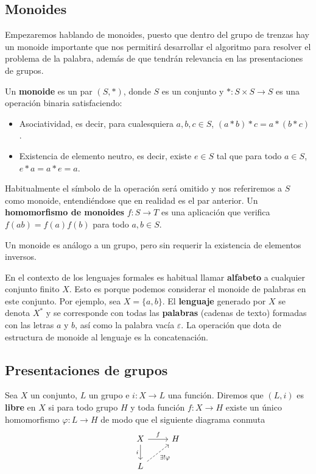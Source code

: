 \documentclass[bibtex, anon]{TEMat-article}
\begin{document}
\subsection{Monoides}

Empezaremos hablando de monoides, puesto que dentro del grupo de trenzas hay un monoide importante que nos permitirá desarrollar el algoritmo para resolver el problema de la palabra, además de que tendrán relevancia en las presentaciones de grupos.



\begin{definicion}
	Un \textbf{monoide} es un par $(S,*)$, donde $S$ es un conjunto y $*:S\times S\to S$ es una operación binaria satisfaciendo:
	\begin{itemize}
		\item Asociatividad, es decir, para cualesquiera $a,b,c\in S$, $(a*b)*c=a*(b*c)$.
		\item Existencia de elemento neutro, es decir, existe $e\in S$ tal que para todo $a\in S$, $e*a=a*e=a$. 
	\end{itemize}
	Habitualmente el símbolo de la operación será omitido y nos referiremos a $S$ como monoide, entendiéndose que en realidad es el par anterior. Un \textbf{homomorfismo de monoides} $f:S\to T$ es una aplicación que verifica $f(ab)=f(a)f(b)$ para todo $a,b\in S$. 
\end{definicion}

\begin{observacion}
	Un monoide es análogo a un grupo, pero sin requerir la existencia de elementos inversos.
\end{observacion}

\begin{ejemplo}
	En el contexto de los lenguajes formales es habitual llamar \textbf{alfabeto} a cualquier conjunto finito $X$. Esto es porque podemos considerar el monoide de palabras en este conjunto. Por ejemplo, sea $X=\{a,b\}$. El \textbf{lenguaje} generado por $X$ se denota $X^*$ y se corresponde con todas las \textbf{palabras} (cadenas de texto) formadas con las letras $a$ y $b$, así como la palabra vacía $\varepsilon$. La operación que dota de estructura de monoide al lenguaje es la concatenación. 
	\end{ejemplo}


\subsection{Presentaciones de grupos}
\begin{definicion}
	Sea $X$ un conjunto, $L$ un grupo e $i:X\to L$ una función. Diremos que $(L,i)$ es \textbf{libre} en $X$ si para todo grupo $H$ y toda función $f:X\to H$ existe un único homomorfismo $\varphi:L\to H$ de modo que el siguiente diagrama conmuta
	\[
	\begin{tikzcd}
	X\arrow[r, "f"]\arrow[d,"i"'] & H\\
	L\arrow[ur, dashed, "\exists!\varphi"']
	\end{tikzcd}
	\]
\end{definicion}
\end{document}
